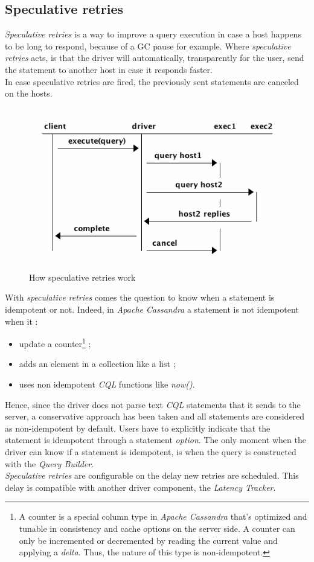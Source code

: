 \documentclass[a4paper]{report}
\newcommand{\ca}{\emph{Apache Cassandra\xspace}}
\newcommand{\sr}{\emph{speculative retries\xspace}}
\begin{document}
\subsection{Speculative retries}
\emph{Speculative retries} is a way to improve a query execution in case a host happens to be long to respond, because of a GC pause for example. Where \sr{} acts, is that the driver will automatically, transparently for the user, send the statement to another host in case it responds faster.\\
In case speculative retries are fired, the previously sent statements are canceled on the hosts.\\
\begin{figure}[ht!]
\centering
\includegraphics[scale=0.7]{spec_rec.png}
\caption{How speculative retries work \label{overflow}}
\end{figure}
With \sr{} comes the question to know when a statement is idempotent or not. Indeed, in \ca{} a statement is not idempotent when it : 
\begin{itemize}
   \item update a counter\footnote{A counter is a special column type in \ca{} that's optimized and tunable in consistency and cache options on the server side. A counter can only be incremented or decremented by reading the current value and applying a \emph{delta}. Thus, the nature of this type is non-idempotent.} ;
   \item adds an element in a collection like a list ;
   \item uses non idempotent \emph{CQL} functions like \emph{now()}.
\end{itemize}
Hence, since the driver does not parse text \emph{CQL} statements that it sends to the server, a conservative approach has been taken and all statements are considered as non-idempotent by default. Users have to explicitly indicate that the statement is idempotent through a statement \emph{option}. The only moment when the driver can know if a statement is idempotent, is when the query is constructed with the \emph{Query Builder}.\\
\emph{Speculative retries} are configurable on the delay new retries are scheduled. This delay is compatible with another driver component, the \emph{Latency Tracker}.
\end{document}
